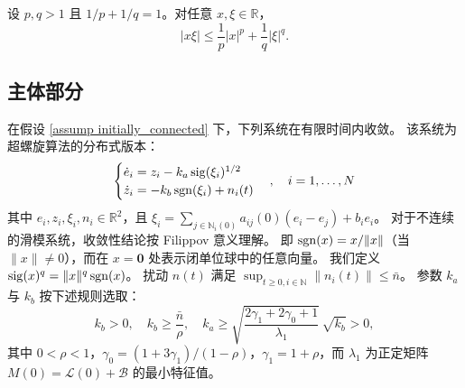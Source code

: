 \begin{lemma}[杨氏不等式]\label{lemma:generalized_young}
    设 $p,q>1$ 且 $1/p+1/q=1$。对任意 $x,\xi\in\mathbb{R}$，
    \begin{equation}
        |x\xi|\leq \frac{1}{p}|x|^p+\frac{1}{q}|\xi|^q.
    \end{equation}
\end{lemma}

\subsection{主体部分}

\begin{lemma}
    \label{lemma estimator}
    在假设 \ref{assump initially_connected} 下，下列系统在有限时间内收敛。
    该系统为超螺旋算法的分布式版本：
    \begin{equation}
        \begin{cases}
        \dot{e}_i=z_i-k_a \operatorname{sig}(\xi_i)^{1/2}\\
        \dot{z}_i=-k_b \operatorname{sgn}(\xi_i) + n_i(t)
    \end{cases},\quad i=1,\ldots,N
    \label{eq sta}
    \end{equation}
    其中 $e_i,z_i,\xi_i, n_i\in \mathbb{R}^2$，且 $\xi_i=\sum_{j\in\mathbb{N}_i(0)}a_{ij}(0)(e_i-e_j)+b_i e_i$。
    对于不连续的滑模系统，收敛性结论按 Filippov 意义理解。
    即 $\operatorname{sgn}(x)=x/\|x\|$（当 $\|x\|\neq 0$），而在 $x=\mathbf{0}$ 处表示闭单位球中的任意向量。
    我们定义 $\operatorname{sig}(x)^q=\|x\|^q \operatorname{sgn}(x)$。
    扰动 $n(t)$ 满足 $\sup_{t\geq 0, i\in \mathbb{N}}\|n_i(t)\| \leq \bar{n}$。
    参数 $k_a$ 与 $k_b$ 按下述规则选取：
    \begin{equation*}
      k_b >0,\quad k_b \geq \frac{\bar{n}}{\rho}, \quad 
      k_a \geq \sqrt{\frac{2\gamma_1+2\gamma_0+1}{\lambda_1}}\,\sqrt{k_b} > 0,
    \end{equation*}
    其中 $0<\rho<1$，$\gamma_0=(1 + 3\gamma_1)/(1 - \rho)$，$\gamma_1=1 + \rho$，而 $\lambda_1$ 为正定矩阵 $M(0)=\mathcal{L}(0)+\mathcal{B}$ 的最小特征值。
\end{lemma}


